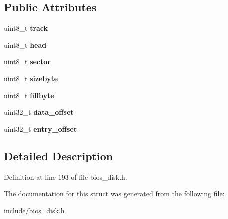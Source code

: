\subsection*{Public Attributes}
\begin{DoxyCompactItemize}
\item 
\hypertarget{structimageDiskVFD_1_1vfdentry_a584716a3b21efbb6fb92e6d4a9fd30bf}{uint8\-\_\-t {\bfseries track}}\label{structimageDiskVFD_1_1vfdentry_a584716a3b21efbb6fb92e6d4a9fd30bf}

\item 
\hypertarget{structimageDiskVFD_1_1vfdentry_a4a98505e2f0be19cf7a7a6df5e5ea4a8}{uint8\-\_\-t {\bfseries head}}\label{structimageDiskVFD_1_1vfdentry_a4a98505e2f0be19cf7a7a6df5e5ea4a8}

\item 
\hypertarget{structimageDiskVFD_1_1vfdentry_ab2db645ccdbcbc76267db774f486b972}{uint8\-\_\-t {\bfseries sector}}\label{structimageDiskVFD_1_1vfdentry_ab2db645ccdbcbc76267db774f486b972}

\item 
\hypertarget{structimageDiskVFD_1_1vfdentry_a1f299aea35eccb67232f2f72eb3472b1}{uint8\-\_\-t {\bfseries sizebyte}}\label{structimageDiskVFD_1_1vfdentry_a1f299aea35eccb67232f2f72eb3472b1}

\item 
\hypertarget{structimageDiskVFD_1_1vfdentry_a7bb993c2cfaef8d5b06749015f821986}{uint8\-\_\-t {\bfseries fillbyte}}\label{structimageDiskVFD_1_1vfdentry_a7bb993c2cfaef8d5b06749015f821986}

\item 
\hypertarget{structimageDiskVFD_1_1vfdentry_ae3f61135f4078782c64c798ca905b9df}{uint32\-\_\-t {\bfseries data\-\_\-offset}}\label{structimageDiskVFD_1_1vfdentry_ae3f61135f4078782c64c798ca905b9df}

\item 
\hypertarget{structimageDiskVFD_1_1vfdentry_ac9240537467abe687506ac21be081991}{uint32\-\_\-t {\bfseries entry\-\_\-offset}}\label{structimageDiskVFD_1_1vfdentry_ac9240537467abe687506ac21be081991}

\end{DoxyCompactItemize}


\subsection{Detailed Description}


Definition at line 193 of file bios\-\_\-disk.\-h.



The documentation for this struct was generated from the following file\-:\begin{DoxyCompactItemize}
\item 
include/bios\-\_\-disk.\-h\end{DoxyCompactItemize}
